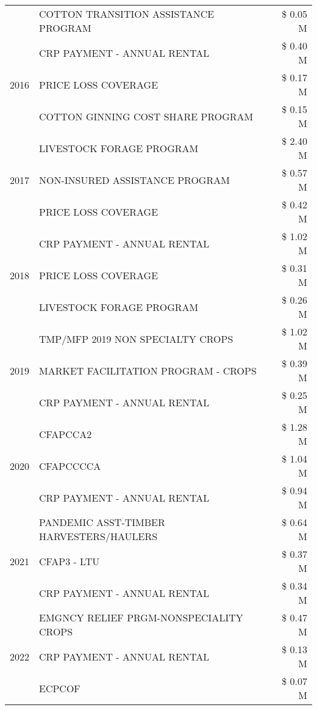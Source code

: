 \begin{tabular}{llr}
 & COTTON TRANSITION ASSISTANCE PROGRAM & \$ 0.05 M \\
\cline{1-3}
\multirow[t]{3}{*}{2016} & CRP PAYMENT - ANNUAL RENTAL & \$ 0.40 M \\
 & PRICE LOSS COVERAGE & \$ 0.17 M \\
 & COTTON GINNING COST SHARE PROGRAM & \$ 0.15 M \\
\cline{1-3}
\multirow[t]{3}{*}{2017} & LIVESTOCK FORAGE PROGRAM & \$ 2.40 M \\
 & NON-INSURED ASSISTANCE PROGRAM & \$ 0.57 M \\
 & PRICE LOSS COVERAGE & \$ 0.42 M \\
\cline{1-3}
\multirow[t]{3}{*}{2018} & CRP PAYMENT - ANNUAL RENTAL & \$ 1.02 M \\
 & PRICE LOSS COVERAGE & \$ 0.31 M \\
 & LIVESTOCK FORAGE PROGRAM & \$ 0.26 M \\
\cline{1-3}
\multirow[t]{3}{*}{2019} & TMP/MFP 2019 NON SPECIALTY CROPS & \$ 1.02 M \\
 & MARKET FACILITATION PROGRAM - CROPS & \$ 0.39 M \\
 & CRP PAYMENT - ANNUAL RENTAL & \$ 0.25 M \\
\cline{1-3}
\multirow[t]{3}{*}{2020} & CFAPCCA2 & \$ 1.28 M \\
 & CFAPCCCCA & \$ 1.04 M \\
 & CRP PAYMENT - ANNUAL RENTAL & \$ 0.94 M \\
\cline{1-3}
\multirow[t]{3}{*}{2021} & PANDEMIC ASST-TIMBER HARVESTERS/HAULERS & \$ 0.64 M \\
 & CFAP3 - LTU & \$ 0.37 M \\
 & CRP PAYMENT - ANNUAL RENTAL & \$ 0.34 M \\
\cline{1-3}
\multirow[t]{3}{*}{2022} & EMGNCY RELIEF PRGM-NONSPECIALITY CROPS & \$ 0.47 M \\
 & CRP PAYMENT - ANNUAL RENTAL & \$ 0.13 M \\
 & ECPCOF & \$ 0.07 M \\
\cline{1-3}
\bottomrule
\end{tabular}
